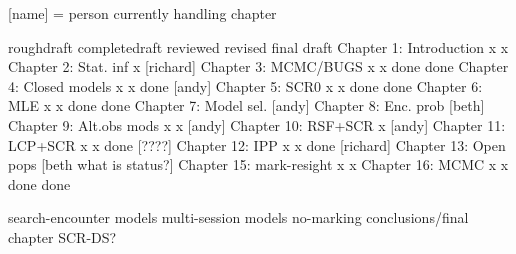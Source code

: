 [name] = person currently handling chapter


                          roughdraft   completedraft  reviewed  revised  final draft
Chapter 1: Introduction       x              x
Chapter 2: Stat. inf          x          [richard]
Chapter 3: MCMC/BUGS          x              x         done      done
Chapter 4: Closed models      x              x         done     [andy]
Chapter 5: SCR0               x              x         done      done
Chapter 6: MLE                x              x         done      done
Chapter 7: Model sel.       [andy]
Chapter 8: Enc. prob        [beth]
Chapter 9: Alt.obs mods       x              x         [andy]
Chapter 10: RSF+SCR           x           [andy]
Chapter 11: LCP+SCR           x              x         done     [????]
Chapter 12: IPP               x              x         done     [richard]
Chapter 13: Open pops       [beth what is status?]
Chapter 15: mark-resight      x              x        
Chapter 16: MCMC              x              x         done      done


search-encounter models
multi-session models
no-marking 
conclusions/final chapter
SCR-DS?


